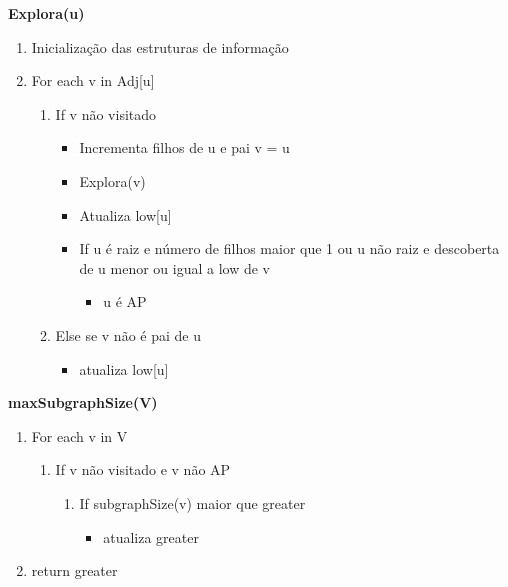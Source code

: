 \documentclass[12pt]{article}
\begin{document}
    \vspace{1em}

    \textbf{Explora(u)}
    \begin{enumerate}
        \setlength\itemsep{0.2em}
        \item Inicialização das estruturas de informação
        \item For each v in Adj[u]
        \begin{enumerate}
            \setlength\itemsep{0.2em}
            \item If v não visitado
            \begin{itemize}
                \setlength\itemsep{0.2em}
                \item Incrementa filhos de u e pai v = u 
                \item Explora(v)
                \item Atualiza low[u]
                \item If u é raiz e número de filhos maior que 1 ou u não raiz e descoberta de u menor ou igual a low de v
                \begin{itemize}
                    \setlength\itemsep{0.2em}
                    \item u é AP
                \end{itemize}
            \end{itemize}
            \item Else se v não é pai de u
            \begin{itemize}
                \setlength\itemsep{0.2em}
                \item atualiza low[u]
            \end{itemize}
        \end{enumerate}
    \end{enumerate}

    \vspace{1em}

    \textbf{maxSubgraphSize(V)}
    \begin{enumerate}
        \setlength\itemsep{0.2em}
        \item For each v in V
        \begin{enumerate}
            \item If v não visitado e v não AP
            \begin{enumerate}
                \setlength\itemsep{0.2em}
                \item If subgraphSize(v) maior que greater
                \begin{itemize}
                    \setlength\itemsep{0.2em}
                    \item atualiza greater
                \end{itemize}
            \end{enumerate}   
        \end{enumerate}
        \item return greater
    \end{enumerate}
\end{document}
